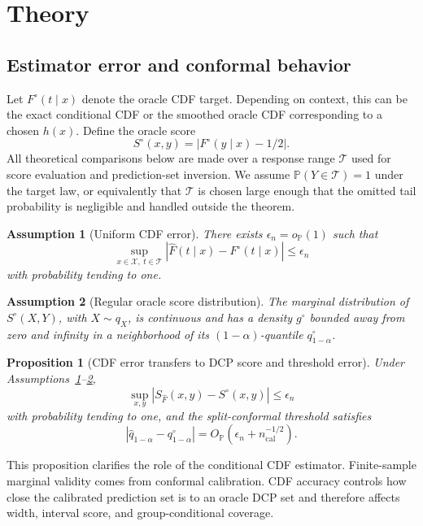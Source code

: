 \documentclass[11pt]{article}
\newtheorem{assumption}{Assumption}
\newtheorem{proposition}{Proposition}
\newcommand{\Xcal}{\mathcal X}
\newcommand{\Tcal}{\mathcal T}
\newcommand{\Pp}{\mathbb P}
\newcommand{\abs}[1]{\left\lvert #1 \right\rvert}
\newcommand{\op}{o_{\mathbb P}}
\newcommand{\Op}{O_{\mathbb P}}
\begin{document}
\section{Theory}
\label{sec:theory}

\subsection{Estimator error and conformal behavior}

Let \(F^\circ(t\mid x)\) denote the oracle CDF target. Depending on context, this can be the exact conditional CDF or the smoothed oracle CDF corresponding to a chosen \(h(x)\). Define the oracle score
\[
  S^\circ(x,y)=\abs{F^\circ(y\mid x)-1/2}.
\]
All theoretical comparisons below are made over a response range \(\Tcal\) used for score evaluation and prediction-set inversion. We assume \(\Pp(Y\in\Tcal)=1\) under the target law, or equivalently that \(\Tcal\) is chosen large enough that the omitted tail probability is negligible and handled outside the theorem.

\begin{assumption}[Uniform CDF error]
\label{ass:uniform}
There exists \(\epsilon_n=\op(1)\) such that
\[
  \sup_{x\in\Xcal,\ t\in\Tcal}
  \abs{\widehat F(t\mid x)-F^\circ(t\mid x)}
  \le \epsilon_n
\]
with probability tending to one.
\end{assumption}

\begin{assumption}[Regular oracle score distribution]
\label{ass:score}
The marginal distribution of \(S^\circ(X,Y)\), with \(X\sim q_X\), is continuous and has a density \(g^\circ\) bounded away from zero and infinity in a neighborhood of its \((1-\alpha)\)-quantile \(q^\circ_{1-\alpha}\).
\end{assumption}

\begin{proposition}[CDF error transfers to DCP score and threshold error]
\label{prop:error-transfer}
Under Assumptions~\ref{ass:uniform}--\ref{ass:score},
\[
  \sup_{x,y}\abs{S_{\widehat F}(x,y)-S^\circ(x,y)}
  \le \epsilon_n
\]
with probability tending to one, and the split-conformal threshold satisfies
\[
  \abs{\widehat q_{1-\alpha}-q^\circ_{1-\alpha}}
  =
  \Op\!\left(\epsilon_n+n_{\mathrm{cal}}^{-1/2}\right).
\]
\end{proposition}

This proposition clarifies the role of the conditional CDF estimator. Finite-sample marginal validity comes from conformal calibration. CDF accuracy controls how close the calibrated prediction set is to an oracle DCP set and therefore affects width, interval score, and group-conditional coverage.
\end{document}

